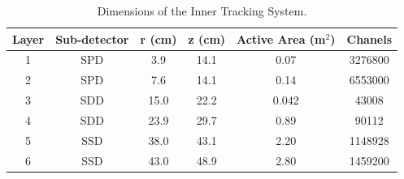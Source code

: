 \documentclass[b5paper,10pt,twoside,oldstyle,classica]{toptesi}
\begin{document}
\begin{table}[tb]
\centering 
\begin{center} %
\renewcommand\arraystretch{1.19} 
\begin{tabular}{|c|c|c|c|c|c|}
\hline
Layer & Sub-detector & r (cm) & z (cm) & Active Area (m$^2$) & Chanels\\
\hline
1 & SPD & 3.9 & 14.1 & 0.07 & 3276800\\
2 & SPD & 7.6 & 14.1 & 0.14 & 6553000\\
3 & SDD & 15.0 & 22.2 & 0.042 & 43008\\
4 & SDD & 23.9 & 29.7 & 0.89 & 90112\\
5 & SSD & 38.0 & 43.1 & 2.20 & 1148928\\
6 & SSD & 43.0 & 48.9 & 2.80 & 1459200\\
\hline
\end{tabular}
\caption{Dimensions of the Inner Tracking System.}
\label{ITStable}
\end{center} 
\end{table}
\end{document}
